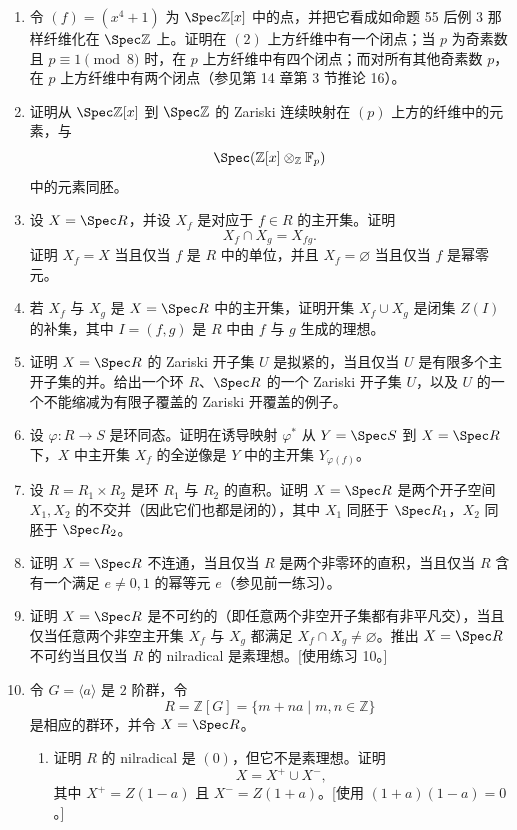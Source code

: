 \begin{enumerate}[label=\arabic*.]
	\item 令 $(f)=(x^4+1)$ 为 $\Spec\mathbb Z[x]$ 中的点，并把它看成如命题 55 后例 3 那样纤维化在 $\Spec\mathbb Z$ 上。证明在 $(2)$ 上方纤维中有一个闭点；当 $p$ 为奇素数且 $p\equiv1\pmod 8$ 时，在 $p$ 上方纤维中有四个闭点；而对所有其他奇素数 $p$，在 $p$ 上方纤维中有两个闭点（参见第 14 章第 3 节推论 16）。
	
	\item 证明从 $\Spec\mathbb Z[x]$ 到 $\Spec\mathbb Z$ 的 Zariski 连续映射在 $(p)$ 上方的纤维中的元素，与
	\[
	\Spec(\mathbb Z[x]\otimes_{\mathbb Z}\mathbb F_p)
	\]
	中的元素同胚。
	
	\item 设 $X=\Spec R$，并设 $X_f$ 是对应于 $f\in R$ 的主开集。证明
	\[
	X_f\cap X_g=X_{fg}.
	\]
	证明 $X_f=X$ 当且仅当 $f$ 是 $R$ 中的单位，并且 $X_f=\varnothing$ 当且仅当 $f$ 是幂零元。
	
	\item 若 $X_f$ 与 $X_g$ 是 $X=\Spec R$ 中的主开集，证明开集 $X_f\cup X_g$ 是闭集 $Z(I)$ 的补集，其中 $I=(f,g)$ 是 $R$ 中由 $f$ 与 $g$ 生成的理想。
	
	\item 证明 $X=\Spec R$ 的 Zariski 开子集 $U$ 是拟紧的，当且仅当 $U$ 是有限多个主开子集的并。给出一个环 $R$、$\Spec R$ 的一个 Zariski 开子集 $U$，以及 $U$ 的一个不能缩减为有限子覆盖的 Zariski 开覆盖的例子。
	
	\item 设 $\varphi:R\to S$ 是环同态。证明在诱导映射 $\varphi^*$ 从 $Y=\Spec S$ 到 $X=\Spec R$ 下，$X$ 中主开集 $X_f$ 的全逆像是 $Y$ 中的主开集 $Y_{\varphi(f)}$。
	
	\item 设 $R=R_1\times R_2$ 是环 $R_1$ 与 $R_2$ 的直积。证明 $X=\Spec R$ 是两个开子空间 $X_1,X_2$ 的不交并（因此它们也都是闭的），其中 $X_1$ 同胚于 $\Spec R_1$，$X_2$ 同胚于 $\Spec R_2$。
	
	\item 证明 $X=\Spec R$ 不连通，当且仅当 $R$ 是两个非零环的直积，当且仅当 $R$ 含有一个满足 $e\ne0,1$ 的幂等元 $e$（参见前一练习）。
	
	\item 证明 $X=\Spec R$ 是不可约的（即任意两个非空开子集都有非平凡交），当且仅当任意两个非空主开集 $X_f$ 与 $X_g$ 都满足 $X_f\cap X_g\ne\varnothing$。推出 $X=\Spec R$ 不可约当且仅当 $R$ 的 nilradical 是素理想。[使用练习 10。]
	
	\item 令 $G=\langle a\rangle$ 是 $2$ 阶群，令
	\[
	R=\mathbb Z[G]=\{m+na\mid m,n\in\mathbb Z\}
	\]
	是相应的群环，并令 $X=\Spec R$。
	\begin{enumerate}[label=(\alph*)]
		\item 证明 $R$ 的 nilradical 是 $(0)$，但它不是素理想。证明
		\[
		X=X^+\cup X^- ,
		\]
		其中 $X^+=Z(1-a)$ 且 $X^-=Z(1+a)$。[使用 $(1+a)(1-a)=0$。]
		

\end{enumerate}
\end{enumerate}
